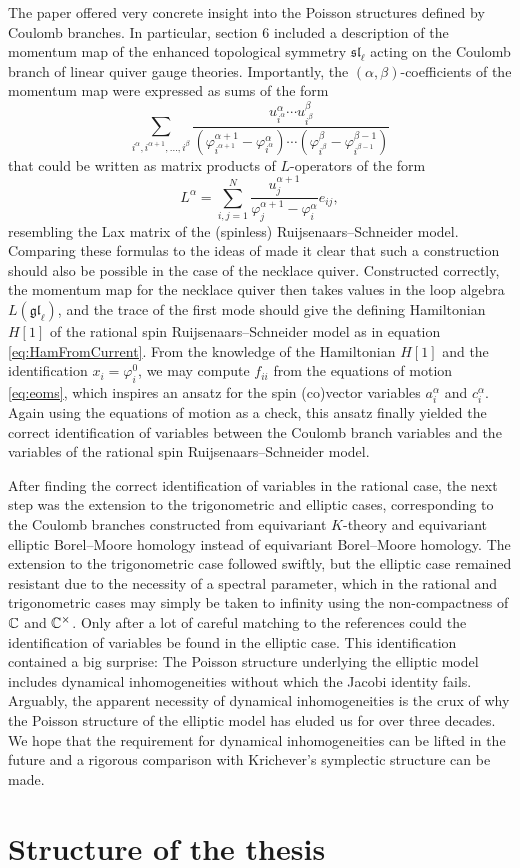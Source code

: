 The paper \cite{bullimore_coulomb_2015} offered very concrete insight into the Poisson structures defined by Coulomb branches. In particular, section 6 included a description of the momentum map of the enhanced topological symmetry $\mathfrak{sl}_\ell$ acting on the Coulomb branch of linear quiver gauge theories. Importantly, the $(\alpha,\beta)$-coefficients of the momentum map were expressed as sums of the form
\begin{equation}
	\sum_{i^\alpha,i^{\alpha+1},\dots,i^\beta} \frac{u_{i^\alpha}^\alpha \cdots u_{i^\beta}^\beta}{(\varphi_{i^{\alpha+1}}^{\alpha+1}-\varphi_{i^\alpha}^\alpha) \cdots (\varphi_{i^\beta}^{\beta}-\varphi_{i^{\beta-1}}^{\beta-1})}
\end{equation}
that could be written as matrix products of $L$-operators of the form
\begin{equation}
	L^\alpha = \sum_{i,j=1}^N \frac{u_j^{\alpha+1}}{\varphi_j^{\alpha+1} - \varphi_i^\alpha} e_{ij},
\end{equation}
resembling the Lax matrix of the (spinless) Ruijsenaars--Schneider model. Comparing these formulas to the ideas of \cite{nakajima_cherkis_2025} made it clear that such a construction should also be possible in the case of the necklace quiver. Constructed correctly, the momentum map for the necklace quiver then takes values in the loop algebra $L(\mathfrak{gl}_\ell)$, and the trace of the first mode should give the defining Hamiltonian $H[1]$ of the rational spin Ruijsenaars--Schneider model as in equation \eqref{eq:HamFromCurrent}. From the knowledge of the Hamiltonian $H[1]$ and the identification $x_i = \varphi_i^0$, we may compute $f_{ii}$ from the equations of motion \eqref{eq:eoms}, which inspires an ansatz for the spin (co)vector variables $a_i^\alpha$ and $c_i^\alpha$. Again using the equations of motion as a check, this ansatz finally yielded the correct identification of variables between the Coulomb branch variables and the variables of the rational spin Ruijsenaars--Schneider model.

After finding the correct identification of variables in the rational case, the next step was the extension to the trigonometric and elliptic cases, corresponding to the Coulomb branches constructed from equivariant $K$-theory and equivariant elliptic Borel--Moore homology instead of equivariant Borel--Moore homology. The extension to the trigonometric case followed swiftly, but the elliptic case remained resistant due to the necessity of a spectral parameter, which in the rational and trigonometric cases may simply be taken to infinity using the non-compactness of $\mathbb{C}$ and $\mathbb{C}^\times$. Only after a lot of careful matching to the references \cite{arutyunov_r-matrix_1997,maruyoshi_wilson-t_2021} could the identification of variables be found in the elliptic case. This identification contained a big surprise: The Poisson structure underlying the elliptic model includes dynamical inhomogeneities without which the Jacobi identity fails. Arguably, the apparent necessity of dynamical inhomogeneities is the crux of why the Poisson structure of the elliptic model has eluded us for over three decades. We hope that the requirement for dynamical inhomogeneities can be lifted in the future and a rigorous comparison with Krichever's symplectic structure can be made.

\section{Structure of the thesis}